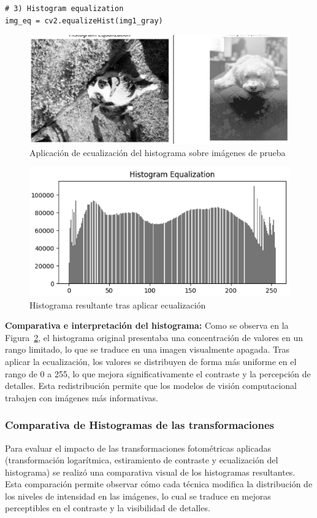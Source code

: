 \documentclass[12pt,letterpaper]{article}
\begin{document}
\begin{verbatim}
# 3) Histogram equalization
img_eq = cv2.equalizeHist(img1_gray)
\end{verbatim}

\begin{figure}[H]
  \centering
  \includegraphics[width=0.8\linewidth]{figuras/ecualizacion_imagen.png}
  \caption{Aplicación de ecualización del histograma sobre imágenes de prueba}
  \label{fig:ecualizacion_imagen}
\end{figure}

\begin{figure}[H]
  \centering
  \includegraphics[width=0.8\linewidth]{figuras/ecualizacion_histograma.png}
  \caption{Histograma resultante tras aplicar ecualización}
  \label{fig:ecualizacion_histograma}
\end{figure}


\textbf{Comparativa e interpretación del histograma:} Como se observa en la Figura~\ref{fig:ecualizacion_histograma}, el histograma original presentaba una concentración de valores en un rango limitado, lo que se traduce en una imagen visualmente apagada. Tras aplicar la ecualización, los valores se distribuyen de forma más uniforme en el rango de 0 a 255, lo que mejora significativamente el contraste y la percepción de detalles. Esta redistribución permite que los modelos de visión computacional trabajen con imágenes más informativas.

\subsubsection{Comparativa de Histogramas de las transformaciones}
Para evaluar el impacto de las transformaciones fotométricas aplicadas (transformación logarítmica, estiramiento de contraste y ecualización del histograma) se realizó una comparativa visual de los histogramas resultantes. Esta comparación permite observar cómo cada técnica modifica la distribución de los niveles de intensidad en las imágenes, lo cual se traduce en mejoras perceptibles en el contraste y la visibilidad de detalles.
\end{document}
